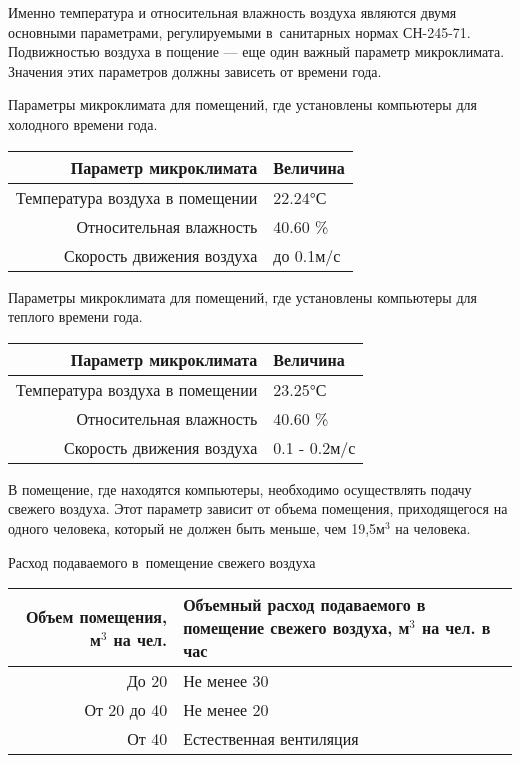 Именно температура и относительная влажность воздуха являются двумя основными параметрами, 
регулируемыми в~санитарных нормах \mbox {СН-245-71}.  
Подвижностью воздуха в пощение --- еще один важный параметр микроклимата.
Значения этих параметров должны зависеть от времени года. 

\begin{dtable}{Параметры микроклимата для помещений, где установлены компьютеры для холодного времени года.}
	\begin{tabular}{|r|l|}
		\hline  Параметр микроклимата  & Величина	 \\ 
		\hline  Температура воздуха в помещении  &  22.24°С \\ 
		\hline  Относительная влажность  &  40.60 \% \\ 
		\hline  Скорость движения воздуха &  до 0.1м/с \\ 
		\hline 
	\end{tabular}
\end{dtable}	

\begin{dtable}{Параметры микроклимата для помещений, где установлены компьютеры для теплого времени года.}
	\begin{tabular}{|r|l|}
		\hline  Параметр микроклимата  & Величина \\ 
		\hline  Температура воздуха в помещении  &  23.25°С \\ 
		\hline  Относительная влажность  &  40.60 \% \\ 
		\hline  Скорость движения воздуха &  0.1 - 0.2м/с \\ 
		\hline 
	\end{tabular} 
\end{dtable}
В помещение, где находятся компьютеры, 
необходимо осуществлять  подачу свежего воздуха.
Этот параметр зависит от объема помещения, 
приходящегося на одного человека, 
который не должен быть меньше, чем 19,5м$^3$ на человека.
\begin{dtable}{Расход подаваемого в~помещение свежего воздуха}
	\begin{tabular}{|r|p{7cm}|}
		\hline  Объем помещения, м$^3$ на чел.  & Объемный расход подаваемого в
			помещение свежего воздуха, м$^3$ на чел. в час	 \\ 
		\hline  До 20		&  Не менее 30  \\ 
		\hline  От 20 до 40 &  Не менее 20  \\ 
		\hline  От 40  		&  Естественная вентиляция  \\ 
		\hline 
	\end{tabular} 
\end{dtable}


